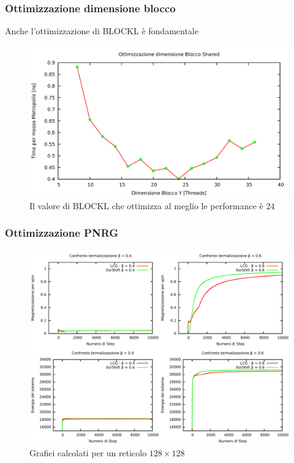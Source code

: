\documentclass{beamer}
\begin{document}
	\begin{frame}
		\frametitle{Ottimizzazione dimensione blocco}
		Anche l'ottimizzazione di BLOCKL \`e fondamentale
		\begin{figure}
				\includegraphics[scale=0.35]{../../CUDA/Result/Res3/Time_BLOCK.pdf}
				\caption{Il valore di BLOCKL che ottimizza al meglio le performance \`e 24}
		\end{figure}
	\end{frame}

	\begin{frame}
		\frametitle{Ottimizzazione PNRG}
		\begin{figure}
				\includegraphics[scale=0.32]{../../CUDA/Term/Term_step_GPU_04_pre.pdf}
				\caption{Grafici calcolati per un reticolo $128\times 128$}
		\end{figure}
	\end{frame}
\end{document}
